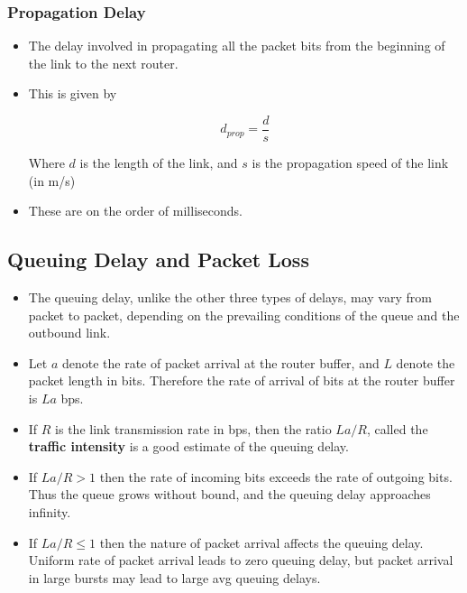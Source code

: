 \documentclass{article}
\theoremstyle{plain}
\theoremstyle{definition}
\begin{document}
\subsubsection{Propagation Delay}
\begin{itemize}
    \item The delay involved in propagating all the packet bits from the beginning of the link to the next router.
    
    \item This is given by
    
    \begin{equation}
        d_{prop} = \frac{d}{s}
    \end{equation}
    
    Where $d$ is the length of the link, and $s$ is the propagation speed of the link (in m/s)
    
    \item These are on the order of milliseconds. 
\end{itemize}

\subsection{Queuing Delay and Packet Loss}

\begin{itemize}
    \item The queuing delay, unlike the other three types of delays, may vary from packet to packet, depending on the prevailing conditions of the queue and the outbound link.
    
    \item Let $a$ denote the rate of packet arrival at the router buffer, and $L$ denote the packet length in bits. Therefore the rate of arrival of bits at the router buffer is $La$ bps.
    
    \item If $R$ is the link transmission rate in bps, then the ratio $La/R$, called the \textbf{traffic intensity} is a good estimate of the queuing delay. 
    
    \item If $La/R > 1$ then the rate of incoming bits exceeds the rate of outgoing bits. Thus the queue grows without bound, and the queuing delay approaches infinity.
    
    \item If $La/R \leq 1$ then the nature of packet arrival affects the queuing delay. Uniform rate of packet arrival leads to zero queuing delay, but packet arrival in large bursts may lead to large avg queuing delays. 
\end{itemize}
\end{document}
